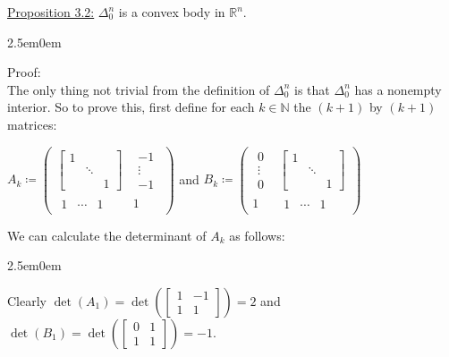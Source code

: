 \documentclass{book}
\newcommand{\exTwo}{%
   \color{Purple}%
   \fontsize{13}{15}\selectfont%
}
\newcommand{\exThreeP}{%
   \color{RedViolet}%
   \fontsize{12}{14}\selectfont%
}
\newcommand{\exPPP}{%
   \color{VioletRed}%
   \fontsize{12}{14}\selectfont%
}
\newenvironment{myIndent}{%
   \begin{adjustwidth}{2.5em}{0em}%
}{%
   \end{adjustwidth}%
}
\newcommand{\retTwo}{\hfill\bigbreak}
\begin{document}
\exTwo\ul{Proposition 3.2:} $\Delta_0^n$ is a convex body in $\mathbb{R}^n$.
\begin{myIndent}\exThreeP
	Proof:\\
	The only thing not trivial from the definition of $\Delta_0^n$ is that $\Delta_0^n$ has a nonempty interior. So to prove this, first define for each $k \in \mathbb{N}$ the $(k+1)$ by $(k+1)$ matrices:

	{\centering $A_k \coloneqq \begin{pmatrix}
		\begin{bmatrix} 1 & & \\ & \ddots & \\ & & 1 \end{bmatrix} & \begin{matrix} -1 \\ \vdots \\ -1 \end{matrix} \\ \begin{matrix} 1 & \cdots & 1 \end{matrix} & 1
	\end{pmatrix}$ and $B_k \coloneqq \begin{pmatrix}
		\begin{matrix} 0 \\ \vdots \\ 0 \end{matrix} & \begin{bmatrix} 1 & & \\ & \ddots & \\ & & 1 \end{bmatrix} \\ 1 & \begin{matrix} 1 & \cdots & 1 \end{matrix}
	\end{pmatrix}$ \retTwo\par}

	We can calculate the determinant of $A_k$ as follows:
	\begin{myIndent}\exPPP
		Clearly $\det(A_1) = \det(\left[ \begin{smallmatrix} 1 & -1 \\ 1 & 1 \end{smallmatrix}\right]) = 2$ and $\det(B_1) = \det(\left[ \begin{smallmatrix} 0 & 1 \\ 1 & 1 \end{smallmatrix}\right]) = -1$.\retTwo
		

\end{myIndent}
\end{myIndent}
\end{document}
